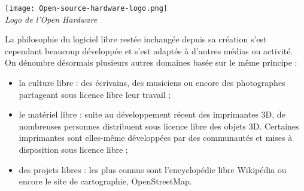 \begin{minipage}{0.3\textwidth}
\begin{center}
\texttt{[image: Open-source-hardware-logo.png]}\\
\textit{Logo de l’Open Hardware}
\end{center}
\end{minipage}
\begin{minipage}{0.7\textwidth}
La philosophie du logiciel libre restée inchangée depuis sa création 
s’est cependant beaucoup développée et s’est adaptée à 
d’autres médias ou activité. On dénombre désormais plusieurs 
autres domaines basée sur le même principe :
\begin{itemize}[label=$\bullet$]
\item la \textcolor{Cdl}{culture libre} : des écrivains, des musiciens 
ou encore des photographes partageant sous licence libre leur travail ;
\item le \textcolor{Cdl}{matériel libre} : suite au développement 
récent des imprimantes 3D, de nombreuses personnes distribuent sous 
licence libre des objets 3D. Certaines imprimantes sont elles-même 
développées par des communautés et mises à disposition sous licence 
libre ;
\item des \textcolor{Cdl}{projets libres} : les plus connus sont 
l’encyclopédie libre Wikipédia ou encore le site de cartographie, 
\mbox{OpenStreetMap}.
\end{itemize}
\end{minipage}


